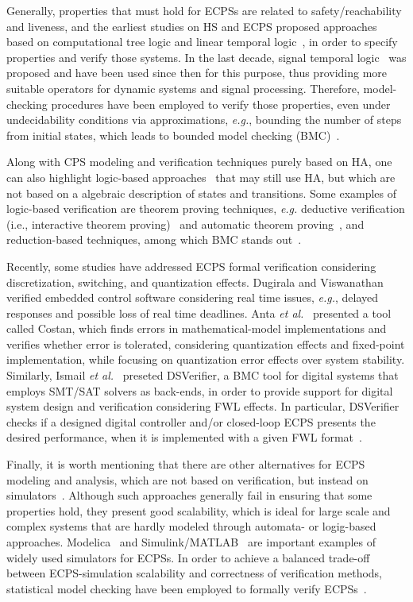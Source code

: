 \documentclass{cta-author}
\begin{document}
Generally, properties that must hold for ECPSs are related to safety/reachability and liveness, and the earliest studies on HS and ECPS proposed approaches based on computational tree logic and linear temporal logic~\cite{Alur93}, in order to specify properties and verify those systems. In the last decade, signal temporal logic~\cite{Maler04,Donze12} was proposed and have been used since then for this purpose, thus providing more suitable operators for dynamic systems and signal processing. Therefore, model-checking procedures have been employed to verify those properties, even under undecidability conditions via approximations, {\it e.g.}, bounding the number of steps from initial states, which leads to bounded model checking (BMC)~\cite{Veanes09}. 

Along with CPS modeling and verification techniques purely based on HA, one can also highlight logic-based approaches~\cite{Phan15} that may still use HA, but which are not based on a algebraic description of states and transitions. Some examples of logic-based verification are theorem proving techniques, {\it e.g.} deductive verification (i.e., interactive theorem proving)~\cite{Nipkow02} and automatic theorem proving~\cite{Platzer07}, and reduction-based techniques, among which BMC stands out~\cite{handbook09}.


Recently, some studies have addressed ECPS formal verification considering discretization, switching, and quantization effects.  Dugirala and Viswanathan~\cite{Duggirala2015} verified embedded control software considering real time issues, {\it e.g.}, delayed responses and possible loss of real time deadlines. Anta {\it et al.}~\cite{Anta10} presented a tool called Costan, which finds errors in mathematical-model implementations and verifies whether error is tolerated, considering quantization effects and fixed-point implementation, while focusing on quantization error effects over system stability. Similarly, Ismail {\it et al.}~\cite{dsv_spin2015} preseted DSVerifier, a BMC tool for digital systems that employs SMT/SAT solvers as back-ends, in order to provide support for digital system design and verification considering FWL effects. In particular, DSVerifier checks if a designed digital controller and/or closed-loop ECPS presents the desired performance, when it is implemented with a given FWL format~\cite{Bessa16,Bessa17}.

Finally, it is worth mentioning that there are other alternatives for ECPS modeling and analysis, which are not based on verification, but instead on simulators~\cite{Phan2014,Nakajima12,Junjie12}. Although such approaches generally fail in ensuring that some properties hold, they present good scalability, which is ideal for large scale and complex systems that are hardly modeled through automata- or logig-based approaches. Modelica~\cite{Junjie12} and Simulink/MATLAB~\cite{Nakajima12} are important examples of widely used simulators for ECPSs. In order to achieve a balanced trade-off between ECPS-simulation scalability and correctness of verification methods, statistical model checking have been employed to formally verify ECPSs~\cite{Clarke11}.
\end{document}
